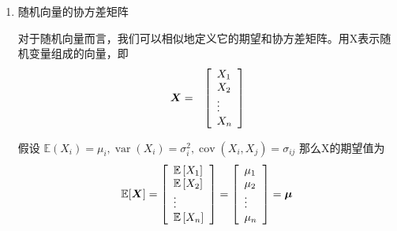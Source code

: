 \begin{enumerate}[1、]
	\item 随机向量的协方差矩阵
	
		对于随机向量而言，我们可以相似地定义它的期望和协方差矩阵。用X表示随机变量组成的向量，即
		\begin{eqnarray}
			\boldsymbol{X} & = & \left[\begin{array}{l}
			X_{1} \\
			X_{2} \\
			\vdots \\
			X_{n}
		    \end{array}\right] \notag
		\end{eqnarray}
		
		假设 $ \mathbb{E}\left(X_{i}\right)=\mu_{i}, \operatorname{var}\left(X_{i}\right)=\sigma_{i}^{2}, \operatorname{cov}\left(X_{i}, X_{j}\right)=\sigma_{i j} $
		那么X的期望值为
		\begin{eqnarray}
			\begin{array}{c}
				\mathbb{E}[\boldsymbol{X}] = \left[\begin{array}{l}
					\mathbb{E}\left[X_{1}\right] \\
					\mathbb{E}\left[X_{2}\right] \\
					\vdots \\
					\mathbb{E}\left[X_{n}\right]
				\end{array}\right] = \left[\begin{array}{l}
				\mu_{1} \\
				\mu_{2} \\
				\vdots \\
				\mu_{n}
			\end{array}\right] = \boldsymbol{\mu}
			\end{array} \notag 
		\end{eqnarray}
	

\end{enumerate}
